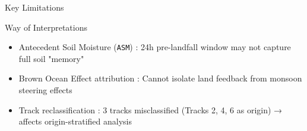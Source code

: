 \documentclass[8pt, aspectratio=169]{beamer}
\begin{document}
\begin{frame}{Key Limitations}
    \vspace{-0.2cm}
    \begin{block}{\small Way of Interpretations}
        \footnotesize
        \begin{itemize}
            \item Antecedent Soil Moisture (\texttt{ASM}) : 24h pre-landfall window may not capture full soil "memory"
            \item Brown Ocean Effect attribution : Cannot isolate land feedback from monsoon steering effects
            \item Track reclassification : 3 tracks misclassified (Tracks 2, 4, 6 as origin) → affects origin-stratified analysis
        \end{itemize}
    \end{block}
\end{frame}
\end{document}
